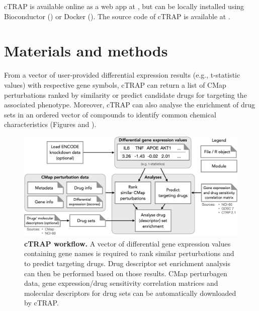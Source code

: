 cTRAP is available online as a web app at , but can be locally installed using Bioconductor () or Docker (). The source code of cTRAP is available at .

\section{Materials and methods}

From a vector of user-provided differential expression results (e.g., t-statistic values) with respective gene symbols, cTRAP can return a list of CMap perturbations ranked by similarity or predict candidate drugs for targeting the associated phenotype. Moreover, cTRAP can also analyse the enrichment of drug sets in an ordered vector of compounds to identify common chemical characteristics (Figures  and ).

\begin{figure}[!ht]
  \includegraphics[width=.8\textwidth]{images/ctrap/workflow}
  \centering
  \caption[cTRAP workflow]{\textbf{cTRAP workflow.} A vector of differential gene expression values containing gene names is required to rank similar perturbations and to predict targeting drugs. Drug descriptor set enrichment analysis can then be performed based on those results. CMap perturbagen data, gene expression/drug sensitivity correlation matrices and molecular descriptors for drug sets can be automatically downloaded by cTRAP.}
  \label{fig:ctrap-workflow}
\end{figure}

